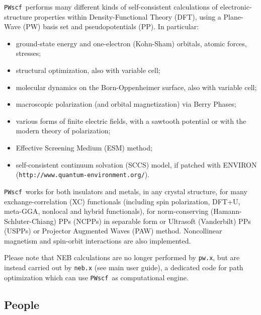 \documentclass[12pt,a4paper]{article}
\def\PWscf{\texttt{PWscf}}
\def\pwx{\texttt{pw.x}}
\begin{document}
\PWscf\ performs many different kinds of
self-consistent calculations of electronic-structure
properties within
Density-Functional Theory (DFT), using a Plane-Wave (PW) basis set and pseudopotentials (PP).
In particular:
\begin{itemize}
  \item ground-state energy and one-electron (Kohn-Sham) orbitals, 
        atomic forces, stresses;
  \item structural optimization, also with variable cell;
  \item molecular dynamics on the Born-Oppenheimer surface, also with variable cell;
  \item macroscopic polarization (and orbital magnetization) via 
    Berry Phases;
  \item various forms of finite electric fields, with a sawtooth potential
    or with the modern theory of polarization;
  \item Effective Screening Medium (ESM) method;
  \item self-consistent continuum solvation (SCCS) model, if patched with
    ENVIRON (\texttt{http://www.quantum-environment.org/}).
\end{itemize}
\PWscf\ works for both insulators and metals, 
in any crystal structure, for many exchange-correlation (XC) functionals
(including spin polarization, DFT+U, meta-GGA, nonlocal and hybrid 
functionals), for
norm-conserving (Hamann-Schluter-Chiang) PPs (NCPPs) in 
separable form or Ultrasoft (Vanderbilt) PPs (USPPs)
or Projector Augmented Waves (PAW) method.
Noncollinear magnetism and spin-orbit interactions 
are also implemented.

Please note that NEB calculations are no longer performed by \pwx,
but are instead carried out by \texttt{neb.x} (see main user guide), 
a dedicated code for path optimization which can use \PWscf\ as 
computational engine.

\subsection{People}
\end{document}
